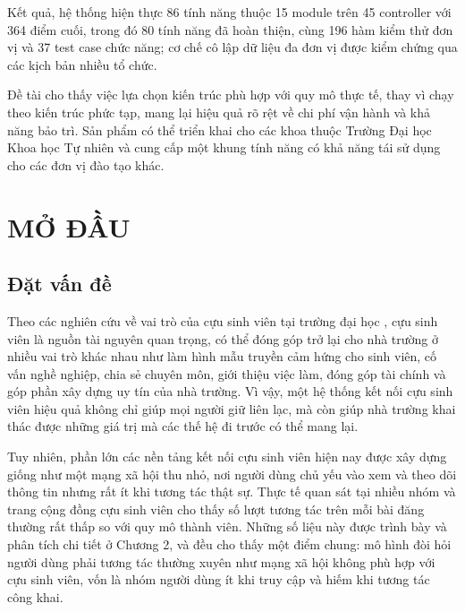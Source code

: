 \documentclass[12pt,a4paper,oneside]{report}
\begin{document}
Kết quả, hệ thống hiện thực 86 tính năng thuộc 15 module trên 45 controller với 364 điểm cuối, trong đó 80 tính năng đã hoàn thiện, cùng 196 hàm kiểm thử đơn vị và 37 test case chức năng; cơ chế cô lập dữ liệu đa đơn vị được kiểm chứng qua các kịch bản nhiều tổ chức.

Đề tài cho thấy việc lựa chọn kiến trúc phù hợp với quy mô thực tế, thay vì chạy theo kiến trúc phức tạp, mang lại hiệu quả rõ rệt về chi phí vận hành và khả năng bảo trì. Sản phẩm có thể triển khai cho các khoa thuộc Trường Đại học Khoa học Tự nhiên và cung cấp một khung tính năng có khả năng tái sử dụng cho các đơn vị đào tạo khác.

\newpage
{}
\setcounter{page}{1}

\chapter{MỞ ĐẦU}

\section{Đặt vấn đề}

Theo các nghiên cứu về vai trò của cựu sinh viên tại trường đại học \cite{obeng,unisel}, cựu sinh viên là nguồn tài nguyên quan trọng, có thể đóng góp trở lại cho nhà trường ở nhiều vai trò khác nhau như làm hình mẫu truyền cảm hứng cho sinh viên, cố vấn nghề nghiệp, chia sẻ chuyên môn, giới thiệu việc làm, đóng góp tài chính và góp phần xây dựng uy tín của nhà trường. Vì vậy, một hệ thống kết nối cựu sinh viên hiệu quả không chỉ giúp mọi người giữ liên lạc, mà còn giúp nhà trường khai thác được những giá trị mà các thế hệ đi trước có thể mang lại.

Tuy nhiên, phần lớn các nền tảng kết nối cựu sinh viên hiện nay được xây dựng giống như một mạng xã hội thu nhỏ, nơi người dùng chủ yếu vào xem và theo dõi thông tin nhưng rất ít khi tương tác thật sự. Thực tế quan sát tại nhiều nhóm và trang cộng đồng cựu sinh viên cho thấy số lượt tương tác trên mỗi bài đăng thường rất thấp so với quy mô thành viên. Những số liệu này được trình bày và phân tích chi tiết ở Chương 2, và đều cho thấy một điểm chung: mô hình đòi hỏi người dùng phải tương tác thường xuyên như mạng xã hội không phù hợp với cựu sinh viên, vốn là nhóm người dùng ít khi truy cập và hiếm khi tương tác công khai.
\end{document}
